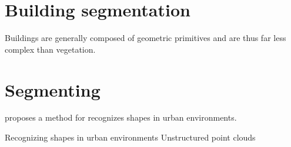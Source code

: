 


\section{Building segmentation}

Buildings are generally composed of geometric primitives and are thus far less complex than vegetation.


\section{Segmenting}
\citet{Golovinskiy2009a} proposes a method for recognizes shapes in urban environments.

Recognizing shapes in urban environments
Unstructured point clouds














